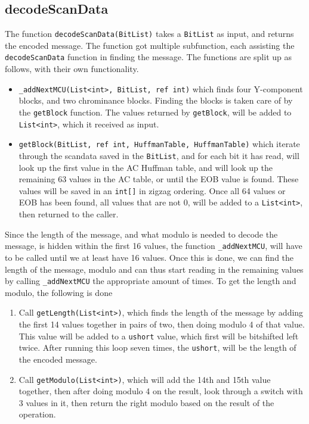 \subsection{decodeScanData}
The function \lstinline|decodeScanData(BitList)| takes a \lstinline|BitList| as input, and returns the encoded message.
The function got multiple subfunction, each assisting the \lstinline|decodeScanData| function in finding the message. The functions are split up as follows, with their own functionality.
\begin{itemize}
	\item \lstinline|_addNextMCU(List<int>, BitList, ref int)| which finds four Y-component blocks, and two chrominance blocks. Finding the blocks is taken care of by the \lstinline|getBlock| function. The values returned by \lstinline|getBlock|, will be added to \lstinline|List<int>|, which it received as input.
	\item \lstinline|getBlock(BitList, ref int, HuffmanTable, HuffmanTable)| which iterate through the scandata saved in the \lstinline|BitList|, and for each bit it has read, will look up the first value in the AC Huffman table, and will look up the remaining 63 values in the AC table, or until the EOB value is found.
	These values will be saved in an \lstinline|int[]| in zigzag ordering.
	Once all 64 values or EOB has been found, all values that are not 0, will be added to a \lstinline|List<int>|, then returned to the caller.
\end{itemize}
Since the length of the message, and what modulo is needed to decode the message, is hidden within the first 16 values, the function \lstinline|_addNextMCU|, will have to be called until we at least have 16 values.
Once this is done, we can find the length of the message, modulo and can thus start reading in the remaining values by calling \lstinline|_addNextMCU| the appropriate amount of times.
To get the length and modulo, the following is done
\begin{enumerate}
	\item Call \lstinline|getLength(List<int>)|, which finds the length of the message by adding the first 14 values together in pairs of two, then doing modulo 4 of that value. 
	This value will be added to a \lstinline|ushort| value, which first will be bitshifted left twice. 
	After running this loop seven times, the \lstinline|ushort|, will be the length of the encoded message.
	\item Call \lstinline|getModulo(List<int>)|, which will add the 14th and 15th value together, then after doing modulo 4 on the result, look through a switch with 3 values in it, then return the right modulo based on the result of the operation.
\end{enumerate}

